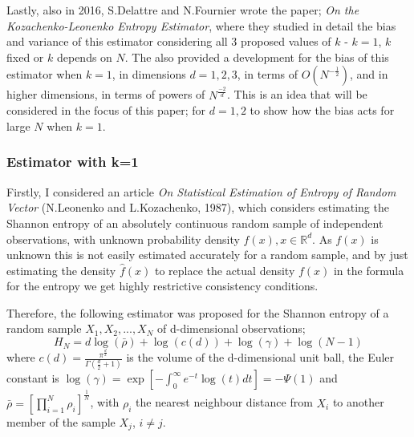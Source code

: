 \documentclass{report}
\begin{document}
Lastly, also in 2016, S.Delattre and N.Fournier wrote the paper; \textit{On the Kozachenko-Leonenko Entropy Estimator}, where they studied in detail the bias and variance of this estimator considering all 3 proposed values of $k$ - $k = 1$, $k$ fixed or $k$ depends on $N$. The also provided a development for the bias of this estimator when $k=1$, in dimensions $d=1,2,3$, in terms of $O(N^{-\frac{1}{2}})$, and in higher dimensions, in terms of powers of $N^{\frac{-2}{d}}$. This is an idea that will be considered in the focus of this paper; for $d=1,2$ to show how the bias acts for large $N$ when $k=1$.


\subsubsection{Estimator with k=1}

Firstly, I considered an article \textit{On Statistical Estimation of Entropy of Random Vector} (N.Leonenko and L.Kozachenko, 1987), which considers estimating the Shannon entropy of an absolutely continuous random sample of independent observations, with unknown probability density $f(x), x \in \mathbb{R}^{d}$. As $f(x)$ is unknown this is not easily estimated accurately for a random sample, and by just estimating the density $\hat{f}(x)$ to replace the actual density $f(x)$ in the formula for the entropy we get highly restrictive consistency conditions. 

Therefore, the following estimator was proposed for the Shannon entropy of a random sample $X_{1}, X_{2}, ..., X_{N}$ of d-dimensional observations;
\begin{equation}
H_{N} = d \log(\bar{\rho } ) + \log (c(d)) + \log (\gamma) + \log (N-1)
\end{equation}
where $c(d) = \frac{\pi^{\frac{d}{2}}}{\Gamma ( \frac{d}{2} + 1 )}$ is the volume of the d-dimensional unit ball, the Euler constant is $\log (\gamma) = \exp \left[ - \int_{0}^{\infty} e^{-t} \log(t) dt \right] = -\Psi(1)$ and $\bar{\rho} = \left[ \prod_{i=1}^{N} \rho_{i} \right]^{\frac{1}{N}}$, with $\rho_{i}$ the nearest neighbour distance from $X_{i}$ to another member of the sample $X_{j}$, $i \neq j$. 
\end{document}
